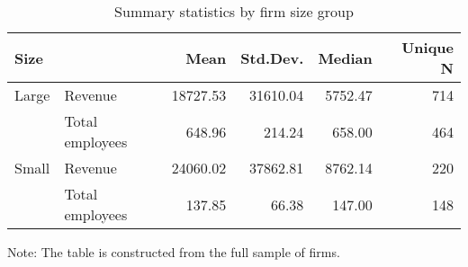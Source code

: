 \begin{table}

\caption{\label{tab:unnamed-chunk-9}Summary statistics by firm size group}
\centering
\begin{threeparttable}
\begin{tabular}[t]{llrrrr}
\toprule
Size &   & Mean & Std.Dev. & Median & Unique N\\
\midrule
Large & Revenue & \num{18727.53} & \num{31610.04} & \num{5752.47} & 714\\
 & Total employees & \num{648.96} & \num{214.24} & \num{658.00} & 464\\
Small & Revenue & \num{24060.02} & \num{37862.81} & \num{8762.14} & 220\\
 & Total employees & \num{137.85} & \num{66.38} & \num{147.00} & 148\\
\bottomrule
\end{tabular}
\begin{tablenotes}
\item Note: The table is constructed from the full sample of firms.
\end{tablenotes}
\end{threeparttable}
\end{table}
